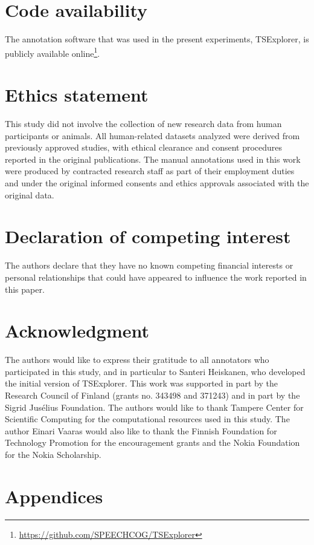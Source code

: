 \documentclass[a4paper,fleqn]{cas-dc}
\begin{document}
\section*{Code availability}

The annotation software that was used in the present experiments, TSExplorer, is publicly available online\footnote{\url{https://github.com/SPEECHCOG/TSExplorer}}.

\section*{Ethics statement}

This study did not involve the collection of new research data from human participants or animals. All human-related datasets analyzed were derived from previously approved studies, with ethical clearance and consent procedures reported in the original publications. The manual annotations used in this work were produced by contracted research staff as part of their employment duties and under the original informed consents and ethics approvals associated with the original data.

\section*{Declaration of competing interest}

The authors declare that they have no known competing financial interests or personal relationships that could have appeared to influence the work reported in this paper.

\section*{Acknowledgment}

The authors would like to express their gratitude to all annotators who participated in this study, and in particular to Santeri Heiskanen, who developed the initial version of TSExplorer. This work was supported in part by the Research Council of Finland (grants no. 343498 and 371243) and in part by the Sigrid Jusélius Foundation. The authors would like to thank Tampere Center for Scientific Computing for the computational resources used in this study. The author Einari Vaaras would also like to thank the Finnish Foundation for Technology Promotion for the encouragement grants and the Nokia Foundation for the Nokia Scholarship.


\section*{Appendices}
\appendix
\end{document}
